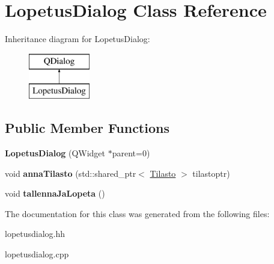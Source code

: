 \hypertarget{class_lopetus_dialog}{\section{Lopetus\-Dialog Class Reference}
\label{class_lopetus_dialog}
}
Inheritance diagram for Lopetus\-Dialog\-:\begin{figure}[H]
\begin{center}
\leavevmode
\includegraphics[height=2.000000cm]{class_lopetus_dialog}
\end{center}
\end{figure}
\subsection*{Public Member Functions}
\begin{DoxyCompactItemize}
\item 
\hypertarget{class_lopetus_dialog_a2ca8a56e125b6c129ed8b941df22f851}{{\bfseries Lopetus\-Dialog} (Q\-Widget $\ast$parent=0)}\label{class_lopetus_dialog_a2ca8a56e125b6c129ed8b941df22f851}

\item 
\hypertarget{class_lopetus_dialog_a5aa4bd894a906205a11981a5a27c7100}{void {\bfseries anna\-Tilasto} (std\-::shared\-\_\-ptr$<$ \hyperlink{class_tilasto}{Tilasto} $>$ tilastoptr)}\label{class_lopetus_dialog_a5aa4bd894a906205a11981a5a27c7100}

\item 
\hypertarget{class_lopetus_dialog_a31810cde5beafe0052d88b4eecc2d4d6}{void {\bfseries tallenna\-Ja\-Lopeta} ()}\label{class_lopetus_dialog_a31810cde5beafe0052d88b4eecc2d4d6}

\end{DoxyCompactItemize}


The documentation for this class was generated from the following files\-:\begin{DoxyCompactItemize}
\item 
lopetusdialog.\-hh\item 
lopetusdialog.\-cpp\end{DoxyCompactItemize}
